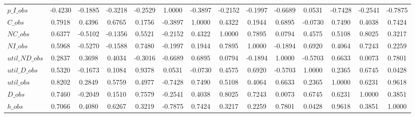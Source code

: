 \begin{center}
\begin{longtable}{lccccccccccccc}
$p\_I\_obs      $	 & 	          -0.4230	 & 	          -0.1885	 & 	          -0.3218	 & 	          -0.2529	 & 	           1.0000	 & 	          -0.3897	 & 	          -0.2152	 & 	          -0.1997	 & 	          -0.6689	 & 	           0.0531	 & 	          -0.7428	 & 	          -0.2541	 & 	          -0.7875 \\ 
$C\_obs         $	 & 	           0.7918	 & 	           0.4396	 & 	           0.6765	 & 	           0.1756	 & 	          -0.3897	 & 	           1.0000	 & 	           0.4322	 & 	           0.1944	 & 	           0.6895	 & 	          -0.0730	 & 	           0.7490	 & 	           0.4038	 & 	           0.7424 \\ 
$NC\_obs        $	 & 	           0.6377	 & 	          -0.5102	 & 	          -0.1356	 & 	           0.5521	 & 	          -0.2152	 & 	           0.4322	 & 	           1.0000	 & 	           0.7895	 & 	           0.0794	 & 	           0.4575	 & 	           0.5108	 & 	           0.8025	 & 	           0.3217 \\ 
$NI\_obs        $	 & 	           0.5968	 & 	          -0.5270	 & 	          -0.1588	 & 	           0.7480	 & 	          -0.1997	 & 	           0.1944	 & 	           0.7895	 & 	           1.0000	 & 	          -0.1894	 & 	           0.6920	 & 	           0.4064	 & 	           0.7243	 & 	           0.2259 \\ 
$util\_ND\_obs  $	 & 	           0.2837	 & 	           0.3698	 & 	           0.4034	 & 	          -0.3016	 & 	          -0.6689	 & 	           0.6895	 & 	           0.0794	 & 	          -0.1894	 & 	           1.0000	 & 	          -0.5703	 & 	           0.6633	 & 	           0.0073	 & 	           0.7801 \\ 
$util\_D\_obs   $	 & 	           0.5320	 & 	          -0.1673	 & 	           0.1084	 & 	           0.9378	 & 	           0.0531	 & 	          -0.0730	 & 	           0.4575	 & 	           0.6920	 & 	          -0.5703	 & 	           1.0000	 & 	           0.2365	 & 	           0.6745	 & 	           0.0428 \\ 
$util\_obs      $	 & 	           0.8202	 & 	           0.2849	 & 	           0.5759	 & 	           0.4977	 & 	          -0.7428	 & 	           0.7490	 & 	           0.5108	 & 	           0.4064	 & 	           0.6633	 & 	           0.2365	 & 	           1.0000	 & 	           0.6231	 & 	           0.9618 \\ 
$D\_obs         $	 & 	           0.7460	 & 	          -0.2049	 & 	           0.1510	 & 	           0.7579	 & 	          -0.2541	 & 	           0.4038	 & 	           0.8025	 & 	           0.7243	 & 	           0.0073	 & 	           0.6745	 & 	           0.6231	 & 	           1.0000	 & 	           0.3851 \\ 
$h\_obs         $	 & 	           0.7066	 & 	           0.4080	 & 	           0.6267	 & 	           0.3219	 & 	          -0.7875	 & 	           0.7424	 & 	           0.3217	 & 	           0.2259	 & 	           0.7801	 & 	           0.0428	 & 	           0.9618	 & 	           0.3851	 & 	           1.0000 \\ 
\end{longtable}
 \end{center}

